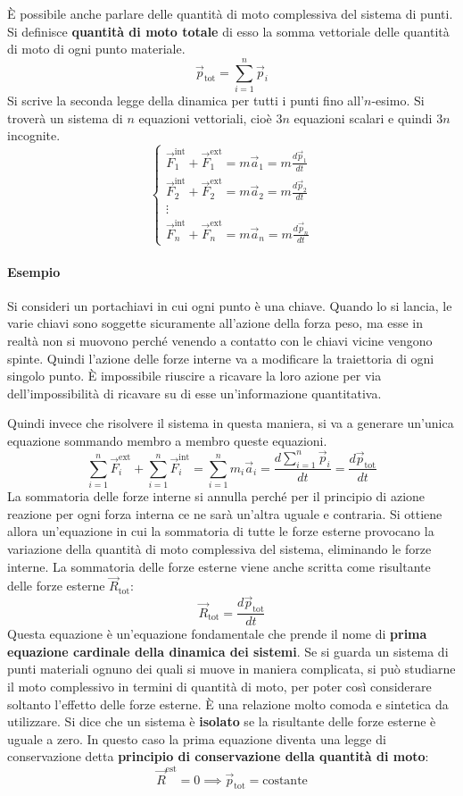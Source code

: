 \documentclass[10pt,a4paper]{book}
\begin{document}
È possibile anche parlare delle quantità di moto complessiva del sistema di punti. Si definisce \textbf{quantità di moto totale} di esso la somma vettoriale delle quantità di moto di ogni punto materiale.
\[
	\vec{p}_\text{tot}=\sum_{i=1}^n \vec{p}_i
\]
Si scrive la seconda legge della dinamica per tutti i punti fino all'$n$-esimo. Si troverà un sistema di $n$ equazioni vettoriali, cioè $3n$ equazioni scalari e quindi $3n$ incognite.
\[
	\begin{cases}
		\vec{F}_1^\text{int} + \vec{F}_1^\text{ext}=m\vec{a}_1=m\frac{d\vec{p}_1}{dt} \\
		\vec{F}_2^\text{int} + \vec{F}_2^\text{ext}=m\vec{a}_2=m\frac{d\vec{p}_2}{dt} \\
		\vdots \\
		\vec{F}_n^\text{int} + \vec{F}_n^\text{ext}=m\vec{a}_n=m\frac{d\vec{p}_n}{dt}
	\end{cases}
\]

\paragraph{Esempio} Si consideri un portachiavi in cui ogni punto è una chiave. Quando lo si lancia, le varie chiavi sono soggette sicuramente all'azione della forza peso, ma esse in realtà non si muovono perché venendo a contatto con le chiavi vicine vengono spinte. Quindi l'azione delle forze interne va a modificare la traiettoria di ogni singolo punto. È impossibile riuscire a ricavare la loro azione per via dell'impossibilità di ricavare su di esse un'informazione quantitativa.

Quindi invece che risolvere il sistema in questa maniera, si va a generare un'unica equazione sommando membro a membro queste equazioni.
\[
	\sum_{i=1}^n \vec{F}_i^\text{ext}+\sum_{i=1}^n \vec{F}_i^\text{int}=\sum_{i=1}^nm_i\vec{a}_i=\frac{d\sum_{i=1}^n\vec{p}_i}{dt}=\frac{d\vec{p}_\text{tot}}{dt}
\]
La sommatoria delle forze interne si annulla perché per il principio di azione reazione per ogni forza interna ce ne sarà un'altra uguale e contraria. Si ottiene allora un'equazione in cui la sommatoria di tutte le forze esterne provocano la variazione della quantità di moto complessiva del sistema, eliminando le forze interne. La sommatoria delle forze esterne viene anche scritta come risultante delle forze esterne $\vec{R}_\text{tot}$:
\[
	\boxed{\vec{R}_\text{tot}=\frac{d\vec{p}_\text{tot}}{dt}}
\]
Questa equazione è un'equazione fondamentale che prende il nome di \textbf{prima equazione cardinale della dinamica dei sistemi}. Se si guarda un sistema di punti materiali ognuno dei quali si muove in maniera complicata, si può studiarne il moto complessivo in termini di quantità di moto, per poter così considerare soltanto l'effetto delle forze esterne. È una relazione molto comoda e sintetica da utilizzare.
Si dice che un sistema è \textbf{isolato} se la risultante delle forze esterne è uguale a zero. In questo caso la prima equazione diventa una legge di conservazione detta \textbf{principio di conservazione della quantità di moto}:
\[
	\boxed{\vec{R}^\text{est}=0 \implies \vec{p}_\text{tot}=\text{costante}}
\]
\end{document}
